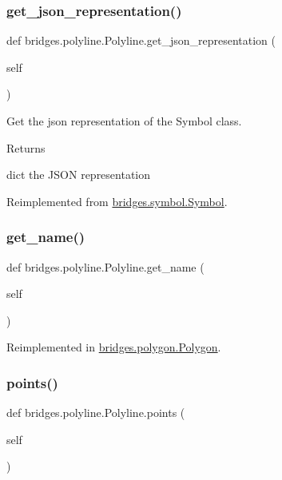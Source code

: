 \subsubsection{\texorpdfstring{get\_json\_representation()}{get\_json\_representation()}}
{\footnotesize\ttfamily def bridges.\+polyline.\+Polyline.\+get\+\_\+json\+\_\+representation (\begin{DoxyParamCaption}\item[{}]{self }\end{DoxyParamCaption})}



Get the json representation of the Symbol class. 

\begin{DoxyReturn}{Returns}


dict the J\+S\+ON representation 
\end{DoxyReturn}


Reimplemented from \mbox{\hyperlink{classbridges_1_1symbol_1_1_symbol_a891a710ff160439aa6dc476ce057f22e}{bridges.\+symbol.\+Symbol}}.

\mbox{\label{classbridges_1_1polyline_1_1_polyline_ac29d5a9cfe5fd60d97a32adef3a6b6bc}} 
\subsubsection{\texorpdfstring{get\_name()}{get\_name()}}
{\footnotesize\ttfamily def bridges.\+polyline.\+Polyline.\+get\+\_\+name (\begin{DoxyParamCaption}\item[{}]{self }\end{DoxyParamCaption})}



Reimplemented in \mbox{\hyperlink{classbridges_1_1polygon_1_1_polygon_afa0d94f62a19b24ad3764bc900718346}{bridges.\+polygon.\+Polygon}}.

\mbox{\label{classbridges_1_1polyline_1_1_polyline_ad1671a5857ad9e4010b7783b472c83fa}} 
\subsubsection{\texorpdfstring{points()}{points()}\hspace{0.1cm}{\footnotesize\ttfamily [1/2]}}
{\footnotesize\ttfamily def bridges.\+polyline.\+Polyline.\+points (\begin{DoxyParamCaption}\item[{}]{self }\end{DoxyParamCaption})}

